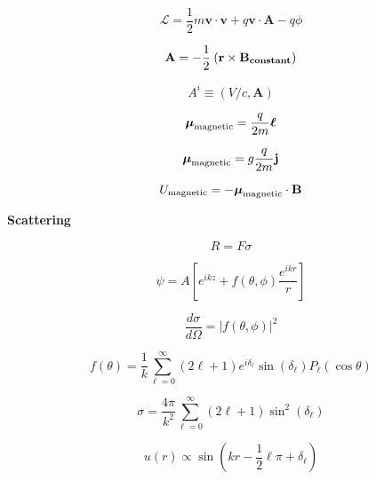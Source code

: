 \documentclass[11pt]{article}
\newcommand{\Lagr}{\mathcal{L}}
\newcommand{\vect}[1]{\boldsymbol{\mathbf{#1}}}
\begin{document}
\begin{multicols}{2}
\begin{equation}
\Lagr = \frac{1}{2} m \vect{v} \cdot \vect{v} + q \vect{v} \cdot \vect{A} - q \phi
\end{equation}

\begin{equation}
\vect{A} = - \frac{1}{2} \: (\vect{r} \times \vect{B_{\rm constant}})
\end{equation}

\begin{equation}
A^{i} \equiv (V/c,\vect{A})
\end{equation}

\begin{equation}
\vect{\mu}_{\rm magnetic} = \frac{q}{2m} \vect{\ell}
\end{equation}

\begin{equation}
\vect{\mu}_{\rm magnetic} = g \frac{q}{2m} \vect{j}
\end{equation}

\begin{equation}
U_{\rm magnetic} = - \vect{\mu}_{\rm magnetic} \cdot \vect{B}
\end{equation}

{\bf Scattering}

\begin{equation}
R = F \sigma
\end{equation}

\begin{equation}
\psi = A \left [
         e^{ikz} + f(\theta,\phi) \frac{e^{ikr}}{r}
         \right ]
\end{equation}

\begin{equation}
\frac{d \sigma}{d \Omega} = |f(\theta,\phi)|^2
\end{equation}

\begin{equation}
f(\theta) = \frac{1}{k} \sum_{\ell=0}^{\infty}
            (2\ell+1) e^{i\delta_{\ell}} \sin(\delta_{\ell})
            P_{\ell}(\cos \theta)
\end{equation}

\begin{equation}
\sigma = \frac{4\pi}{k^2} \sum_{\ell = 0}^{\infty} (2\ell+1)    
         \sin ^2(\delta_{\ell})
\end{equation}

\begin{equation}
u(r) \propto \sin \left( kr - \frac{1}{2}\ell\pi+\delta_{\ell}
                  \right)
\end{equation}


\end{multicols}
\end{document}
